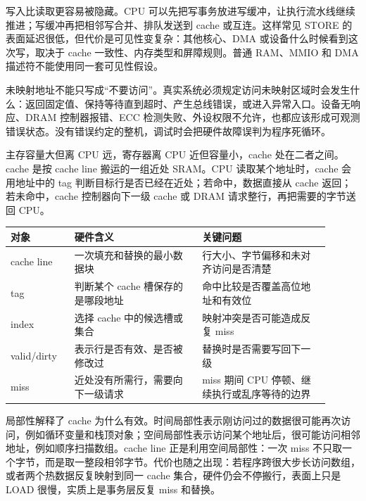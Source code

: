 
写入比读取更容易被隐藏。CPU 可以先把写事务放进写缓冲，让执行流水线继续推进；写缓冲再把相邻写合并、排队发送到 cache 或互连。这样常见 STORE 的表面延迟很低，但代价是可见性变复杂：其他核心、DMA 或设备什么时候看到这次写，取决于 cache 一致性、内存类型和屏障规则。普通 RAM、MMIO 和 DMA 描述符不能使用同一套可见性假设。

未映射地址不能只写成“不要访问”。真实系统必须规定访问未映射区域时会发生什么：返回固定值、保持等待直到超时、产生总线错误，或进入异常入口。设备无响应、DRAM 控制器报错、ECC 检测失败、外设权限不允许，也都应该形成可观测错误状态。没有错误约定的整机，调试时会把硬件故障误判为程序死循环。

主存容量大但离 CPU 远，寄存器离 CPU 近但容量小，cache 处在二者之间。cache 是按 cache line 搬运的一组近处 SRAM。CPU 读取某个地址时，cache 会用地址中的 tag 判断目标行是否已经在近处；若命中，数据直接从 cache 返回；若未命中，cache 控制器向下一级 cache 或 DRAM 请求整行，再把需要的字节送回 CPU。

\begin{longtable}{L{0.18\linewidth}L{0.36\linewidth}L{0.36\linewidth}}
\toprule
对象 & 硬件含义 & 关键问题 \\
\midrule
cache line & 一次填充和替换的最小数据块 & 行大小、字节偏移和未对齐访问是否清楚 \\
tag & 判断某个 cache 槽保存的是哪段地址 & 命中比较是否覆盖高位地址和有效位 \\
index & 选择 cache 中的候选槽或集合 & 映射冲突是否可能造成反复 miss \\
valid/dirty & 表示行是否有效、是否被修改过 & 替换时是否需要写回下一级 \\
miss & 近处没有所需行，需要向下一级请求 & miss 期间 CPU 停顿、继续执行或乱序等待的边界 \\
\bottomrule
\end{longtable}

局部性解释了 cache 为什么有效。时间局部性表示刚访问过的数据很可能再次访问，例如循环变量和栈顶对象；空间局部性表示访问某个地址后，很可能访问相邻地址，例如顺序扫描数组。cache line 正是利用空间局部性：一次 miss 不只取一个字节，而是取一整段相邻字节。代价也随之出现：若程序跨很大步长访问数组，或者两个热数据反复映射到同一 cache 集合，硬件仍会不停搬行，表面上只是 LOAD 很慢，实质上是事务层反复 miss 和替换。

